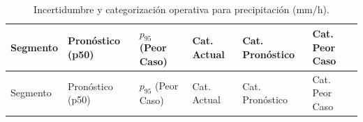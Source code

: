 \documentclass[
  spanish,
  us-letterpaper,
]{scrreprt}
\numberwithin{equation}{section}
\begin{document}
\begin{longtable}[]{@{}
  >{\raggedright\arraybackslash}p{}
  >{\raggedright\arraybackslash}p{}
  >{\raggedright\arraybackslash}p{}
  >{\raggedright\arraybackslash}p{}
  >{\raggedright\arraybackslash}p{}
  >{\raggedright\arraybackslash}p{}@{}}
\caption{Incertidumbre y categorización operativa para precipitación
(mm/h).}\label{tbl-incertidumbre-lluvia}\tabularnewline
\toprule\noalign{}
\begin{minipage}[b]{\linewidth}\raggedright
Segmento
\end{minipage} & \begin{minipage}[b]{\linewidth}\raggedright
Pronóstico (p50)
\end{minipage} & \begin{minipage}[b]{\linewidth}\raggedright
\(p_{95}\) (Peor Caso)
\end{minipage} & \begin{minipage}[b]{\linewidth}\raggedright
Cat. Actual
\end{minipage} & \begin{minipage}[b]{\linewidth}\raggedright
Cat. Pronóstico
\end{minipage} & \begin{minipage}[b]{\linewidth}\raggedright
Cat. Peor Caso
\end{minipage} \\
\midrule\noalign{}
\endfirsthead
\toprule\noalign{}
\begin{minipage}[b]{\linewidth}\raggedright
Segmento
\end{minipage} & \begin{minipage}[b]{\linewidth}\raggedright
Pronóstico (p50)
\end{minipage} & \begin{minipage}[b]{\linewidth}\raggedright
\(p_{95}\) (Peor Caso)
\end{minipage} & \begin{minipage}[b]{\linewidth}\raggedright
Cat. Actual
\end{minipage} & \begin{minipage}[b]{\linewidth}\raggedright
Cat. Pronóstico
\end{minipage} & \begin{minipage}[b]{\linewidth}\raggedright
Cat. Peor Caso
\end{minipage} \\

\end{longtable}
\end{document}
